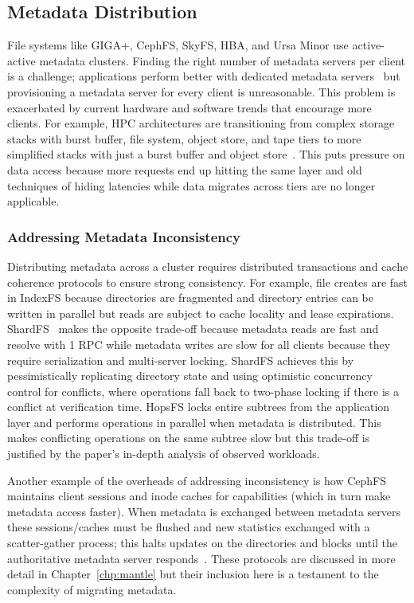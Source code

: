 \subsection{Metadata Distribution}

File systems like GIGA+, CephFS, SkyFS, HBA, and Ursa Minor use active-active
metadata clusters. Finding the right number of metadata servers per client is a
challenge; applications perform better with dedicated metadata
servers~\cite{sevilla:sc15-mantle, ren:sc2014-indexfs} but provisioning a
metadata server for every client is unreasonable.  This problem is exacerbated
by current hardware and software trends that encourage more clients. For
example, HPC architectures are transitioning from complex storage stacks with
burst buffer, file system, object store, and tape tiers to more simplified
stacks with just a burst buffer and object
store~\cite{bent:login16-hpc-trends}. This puts pressure on data access because
more requests end up hitting the same layer and old techniques of hiding
latencies while data migrates across tiers are no longer applicable.

\subsubsection{Addressing Metadata Inconsistency}

Distributing metadata across a cluster requires distributed transactions and
cache coherence protocols to ensure strong consistency.  For example, file
creates are fast in IndexFS because directories are fragmented and directory
entries can be written in parallel but reads are subject to cache locality and
lease expirations.  ShardFS~\cite{xiao:socc15-shardfs} makes the opposite
trade-off because metadata reads are fast and resolve with 1 RPC while metadata
writes are slow for all clients because they require serialization and
multi-server locking.  ShardFS achieves this by pessimistically replicating
directory state and using optimistic concurrency control for conflicts, where
operations fall back to two-phase locking if there is a conflict at
verification time. HopsFS locks entire subtrees from the application layer and
performs operations in parallel when metadata is distributed. This makes
conflicting operations on the same subtree slow but this trade-off is
justified by the paper's in-depth analysis of observed workloads.

Another example of the overheads of addressing inconsistency is how CephFS
maintains client sessions and inode caches for capabilities (which in turn make
metadata access faster). When metadata is exchanged between metadata servers
these sessions/caches must be flushed and new statistics exchanged with a
scatter-gather process; this halts updates on the directories and blocks until
the authoritative metadata server responds~\cite{docs:cephinternals}.  These
protocols are discussed in more detail in Chapter~\ref{chp:mantle} but their
inclusion here is a testament to the complexity of migrating metadata.

